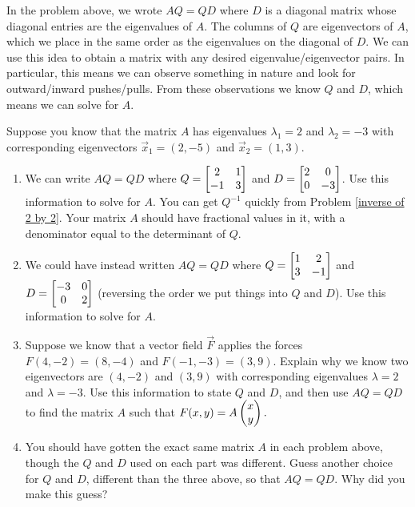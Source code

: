 In the problem above, we wrote $AQ=QD$ where $D$ is a diagonal matrix whose diagonal entries are the eigenvalues of $A$. The columns of $Q$ are eigenvectors of $A$, which we place in the same order as the eigenvalues on the diagonal of $D$. We can use this idea to obtain a matrix with any desired eigenvalue/eigenvector pairs. In particular, this means we can observe something in nature and look for outward/inward pushes/pulls. From these observations we know $Q$ and $D$, which means we can solve for $A$. 


\begin{problem}
Suppose you know that the matrix $A$ has eigenvalues $\lambda_1=2$ and $\lambda_2=-3$ with corresponding eigenvectors $\vec x_1=(2,-5)$ and $\vec x_2 = (1,3)$.
\begin{enumerate}
 \item 
{}%
We can write $AQ=QD$ where $Q=\begin{bmatrix} \begin{matrix} 2\\-1 \end{matrix}&\begin{matrix} 1\\3 \end{matrix} \end{bmatrix}$ and $D=\begin{bmatrix} 2&0\\0&-3 \end{bmatrix}$. Use this information to solve for $A$.  You can get $Q^{-1}$ quickly from Problem \ref{inverse of 2 by 2}.  Your matrix $A$ should have fractional values in it, with a denominator equal to the determinant of $Q$.
 \item We could have instead written $AQ=QD$ where $Q=\begin{bmatrix} \begin{matrix} 1\\3 \end{matrix}&\begin{matrix} 2\\-1 \end{matrix} \end{bmatrix}$ and $D=\begin{bmatrix} -3&0\\0&2 \end{bmatrix}$ (reversing the order we put things into $Q$ and $D$). Use this information to solve for $A$.
 \item Suppose we know that a vector field $\vec F$ applies the forces $F(4,-2) = (8,-4)$ and $F(-1,-3) = (3,9)$. Explain why we know two eigenvectors are $(4,-2)$ and $(3,9)$ with corresponding eigenvalues $\lambda=2$ and $\lambda =-3$.  Use this information to state $Q$ and $D$, and then use $AQ=QD$ to find the matrix $A$ such that $F(x,y)=A\begin{pmatrix} x\\y \end{pmatrix}.$
 \item You should have gotten the exact same matrix $A$ in each problem above, though the $Q$ and $D$ used on each part was different. Guess another choice for $Q$ and $D$, different than the three above, so that $AQ=QD$. Why did you make this guess? 
\end{enumerate}
\end{problem}

